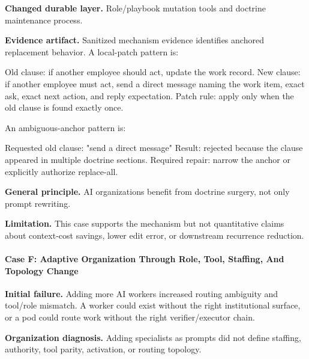 \documentclass[
]{article}
\newenvironment{Shaded}{}{}
\newcommand{\NormalTok}[1]{#1}
\begin{document}
\textbf{Changed durable layer.} Role/playbook mutation tools and doctrine maintenance process.

\textbf{Evidence artifact.} Sanitized mechanism evidence identifies anchored replacement behavior. A local-patch pattern is:

\begin{Shaded}
\begin{Highlighting}[]
\NormalTok{Old clause: if another employee should act, update the work record.}
\NormalTok{New clause: if another employee must act, send a direct message naming the work item, exact ask, exact next action, and reply expectation.}
\NormalTok{Patch rule: apply only when the old clause is found exactly once.}
\end{Highlighting}
\end{Shaded}

An ambiguous-anchor pattern is:

\begin{Shaded}
\begin{Highlighting}[]
\NormalTok{Requested old clause: "send a direct message"}
\NormalTok{Result: rejected because the clause appeared in multiple doctrine sections.}
\NormalTok{Required repair: narrow the anchor or explicitly authorize replace{-}all.}
\end{Highlighting}
\end{Shaded}

\textbf{General principle.} AI organizations benefit from doctrine surgery, not only prompt rewriting.

\textbf{Limitation.} This case supports the mechanism but not quantitative claims about context-cost savings, lower edit error, or downstream recurrence reduction.

\paragraph{Case F: Adaptive Organization Through Role, Tool, Staffing, And Topology Change}\label{case-f-adaptive-organization-through-role-tool-staffing-and-topology-change}

\textbf{Initial failure.} Adding more AI workers increased routing ambiguity and tool/role mismatch. A worker could exist without the right institutional surface, or a pod could route work without the right verifier/executor chain.

\textbf{Organization diagnosis.} Adding specialists as prompts did not define staffing, authority, tool parity, activation, or routing topology.
\end{document}
